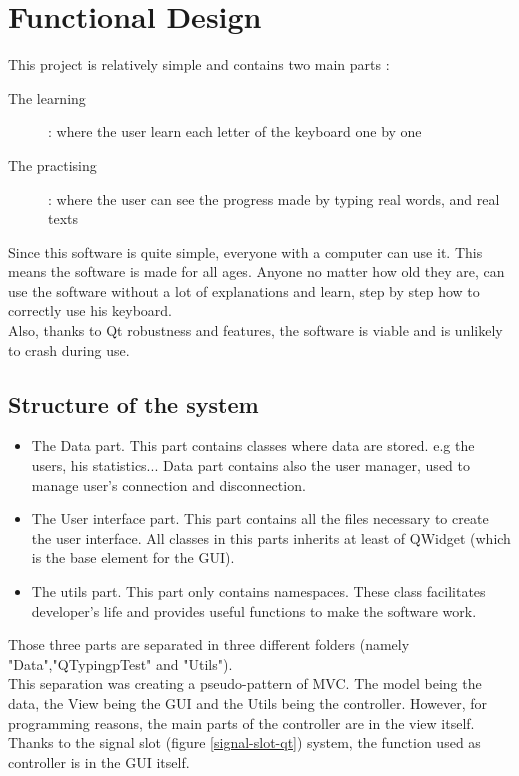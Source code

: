 \chapter{Functional Design}
This project is relatively simple and contains two main parts :
\begin{description}
	\item[The learning] : where the user learn each letter of the keyboard one by one
	\item[The practising] : where the user can see the progress made by typing real words, and real texts
\end{description}
Since this software is quite simple, everyone with a computer can use it. This means the software is made for all ages. Anyone no matter how old they are, can use the software without a lot of explanations and learn, step by step how to correctly use his keyboard.\\
Also, thanks to Qt robustness and features, the software is viable and is unlikely to crash during use.

\section{Structure of the system}

\begin{itemize}
	\item The Data part. This part contains classes where data are stored. e.g the users, his statistics... Data part contains also the user manager, used to manage user's connection and disconnection.
	\item The User interface part. This part contains all the files necessary to create the user interface. All classes in this parts inherits at least of QWidget (which is the base element for the GUI).
	\item The utils part. This part only contains namespaces. These class facilitates developer's life and provides useful functions to make the software work.  
\end{itemize}

Those three parts are separated in three different folders (namely "Data","QTypingpTest" and "Utils").\\
This separation was creating a pseudo-pattern of MVC. The model being the data, the View being the GUI and the Utils being the controller. However, for programming reasons, the main parts of the controller are in the view itself. Thanks to the signal slot (figure \ref{signal-slot-qt}) system, the function used as controller is in the GUI itself.

